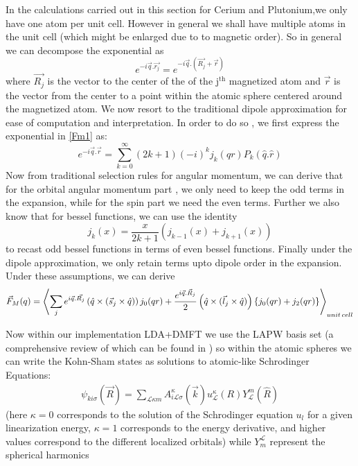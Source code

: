 \documentclass[10pt]{ruthesis}
\begin{document}
{In the calculations carried out in this section for Cerium and Plutonium,we only have one atom per unit cell. However in general we shall have multiple atoms in the unit cell (which might be enlarged due to to magnetic order). So in general we can decompose the exponential as
\begin{equation}
e^{-i\vec{q}.\vec{r_j}}= e^{-i\vec{q}.\left(\vec{R_j}+ \vec{r}\right)}
\end{equation}
where $\vec{R_j}$ is the vector to the center of the of the j$^\mathrm{th}$ magnetized atom and $\vec{r}$ is the vector from the center to a point within the atomic sphere centered around the magnetized atom.  We now resort to the traditional dipole approximation for ease of computation and interpretation. In order to do so , we first express the exponential in \ref{Fm1} as:
\begin{equation}
e^{-i\vec{q}.\vec{r}}= \sum^{\infty}_{k=0} (2k+1) (-i)^k j_k(qr) P_k(\hat{q}.\hat{r})
\end{equation}
Now from traditional selection rules for angular momentum, we can derive that for the orbital angular momentum part , we only need to keep the odd terms in the expansion, while for the spin part we need the even terms. Further we also know that for bessel functions, we can use the identity
\begin{equation}
j_k(x)= \frac{x}{2k+1} \left( j_{k-1}(x) +j_{k+1}(x)\right)
\end{equation}
to recast odd bessel functions in terms of even bessel functions. Finally under the dipole approximation, we only retain terms upto dipole order in the expansion. Under these assumptions, we can derive 
\begin{align}
\vec{F}_M(q)=  \left\langle \sum_{j}  e^{i\vec{q}.\vec{R_j}} \left( \hat{q} \times (\vec{s}_{j} \times \hat{q}) \right) j_{0}(qr)+ \dfrac{e^{i\vec{q}.\vec{R}_j}}{2}\left( \hat{q}\times (\vec{l}_{j} \times \hat{q}) \right) \left \lbrace j_{0}(qr) +j_{2}(qr) \right \rbrace \right\rangle _ {unit \hspace{0.5 mm} cell}
\end{align}

Now within our implementation LDA+DMFT we use the LAPW basis set (a comprehensive review of which can be found in \cite{LAPW_Book}) so within the atomic spheres we can write the Kohn-Sham states as solutions to atomic-like Schrodinger Equations:
 \begin{align}
 \psi_{ki \sigma}(\vec{R})=\sum_{\mathcal{L}\kappa m} A_{i \mathcal{L} \sigma }^{\kappa}(\vec{k}) u_{\mathcal{L}}^{\kappa}(R) Y_{\mathcal{L}}^{m}(\hat{R})
 \end{align}
 (here $\kappa=0 $ corresponds to the solution of the Schrodinger equation $u_{l}$ for a given linearization energy, $\kappa=1$ corresponds to the energy derivative, and higher values correspond to the different localized orbitals) while $Y_m^{\mathcal{L}}$ represent the spherical harmonics
 
}
\end{document}
